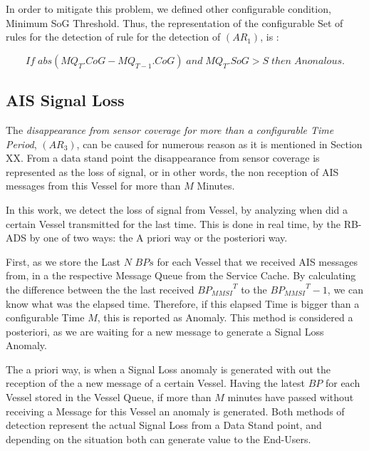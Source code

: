 In order to mitigate this problem, we defined other configurable condition, Minimum SoG Threshold. Thus, the representation of the configurable Set of rules for the detection of rule for the detection of $(AR_1)$, is :

\[ If\; abs(MQ_{T}.CoG - MQ_{T-1}.CoG)\;and\; MQ_T.SoG > S\; then\; Anonalous.\]

\subsection{AIS Signal Loss}
\label{subsection: 4 AIS Signal Loss}
The \textit{disappearance from sensor coverage for more than a configurable Time Period}, $(AR_3)$, can be caused for numerous reason as it is mentioned in Section XX. From a data stand point the disappearance from sensor coverage is represented as the loss of signal, or in other words, the non reception of AIS messages from this Vessel for more than $M$ Minutes.

In this work, we detect the loss of signal from Vessel, by analyzing when did a certain Vessel transmitted for the last time. This is done in real time, by the RB-ADS by one of two ways: the A priori way or the posteriori way.

First, as we store the Last $N$ $BPs$ for each Vessel that we received AIS messages from, in a the respective Message Queue from the Service Cache. By calculating the difference between the the last received ${BP_{MMSI}}^T$ to the ${BP_{MMSI}}^T-1$, we can know what was the elapsed time. Therefore, if this elapsed Time is bigger than a configurable Time $M$, this is reported as Anomaly. This method is considered a posteriori, as we are waiting for a new message to generate a Signal Loss Anomaly.

The a priori way, is when a Signal Loss anomaly is generated with out the reception of the a new message of a certain Vessel. Having the latest $BP$ for each Vessel stored in the Vessel Queue, if more than $M$ minutes have passed without receiving a Message for this Vessel an anomaly is generated. Both methods of detection represent the actual Signal Loss from a Data Stand point, and depending on the situation both can generate value to the End-Users. 

